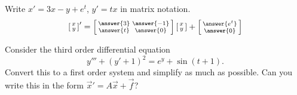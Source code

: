 \documentclass{ximera}
\begin{document}
\begin{exercise}%
    Write $x'=3x-y+e^t$, $y'=tx$ in matrix notation.\\
    \[
        \left[ \begin{smallmatrix}
        x \\ y
        \end{smallmatrix}\right] '
        =
        \left[ \begin{smallmatrix}
        \answer{3} & \answer{-1} \\
        \answer{t} & \answer{0}
        \end{smallmatrix}\right]
        \left[ \begin{smallmatrix}
        x \\ y
        \end{smallmatrix}\right]
        +
        \left[ \begin{smallmatrix}
        \answer{e^{t}} \\ \answer{0}
        \end{smallmatrix}\right]
    \]
\end{exercise}

\begin{exercise}
    Consider the third order differential equation
    \begin{equation*}
        y''' + (y'+1)^2 = e^y + \sin(t+1).
    \end{equation*}
    Convert this to a first order system and simplify as much as possible. Can you write this in the form $\vec{x}' = A\vec{x} + \vec{f}$? 
    \begin{multipleChoice}
    \end{multipleChoice}
    
\end{exercise}
\end{document}
